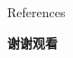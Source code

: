 \documentclass[aspectratio=169,xcolor=dvipsnames,UTF8]{beamer}
\begin{document}
	\begin{frame}{References}
		\printbibliography
	\end{frame}
	
	
	\begin{frame}
		\Huge{\centerline{\textbf{谢谢观看}}}
	\end{frame}
	
\end{document}
